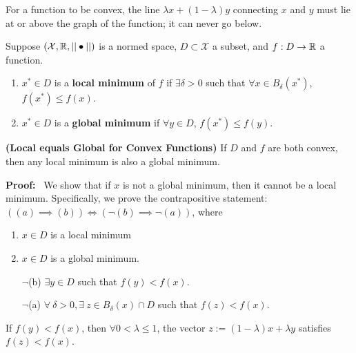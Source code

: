 \begin{rem} For a function to be convex, the line $\lambda x + (1 - \lambda)y$ connecting $x$ and $y$ must lie at or above the graph of the function; it can never go below.

\end{rem}


\begin{definition} Suppose $(\mathcal{X},\mathbb R,||  \bullet ||)$ is a normed space, $D\subset \mathcal{X}$ a subset, and $f:D\to \mathbb R$ a function.
\renewcommand{\labelenumi}{(\alph{enumi})}
\begin{enumerate}
\item
$x^\ast \in D$ is a \textbf{ local minimum} of $f$ if $\exists \delta >0$ such that $\forall x\in B_\delta(x^\ast)$,
$f(x^\ast) \le f(x)$.
\item
$x^\ast \in D$ is a \textbf{ global minimum} if $\forall y \in D$, $f(x^\ast) \le f(y)$.
\end{enumerate}

\end{definition}

\begin{thm}\textbf{(Local equals Global for Convex Functions)} If $D$ and $f$ are both convex, then any local minimum is also a global minimum.
\end{thm} 

\textbf{ Proof:}~  We show that if $x$ is not a global minimum, then it cannot be a local minimum. Specifically, we prove the contrapositive statement: $((a) \implies (b)) \iff (\lnot (b) \implies \lnot (a))$, where
\begin{enumerate}
       \renewcommand{\labelenumi}{(\alph{enumi})}
        \setlength{\itemsep}{.1cm}
    \item $x\in D$ is a local minimum
    \item $x \in D$ is a global minimum.
       
    \item[$\lnot$(b)] $\exists y \in D$ such that $f(y) < f(x)$.
    
     \item[$\lnot$(a)] $\forall~\delta>0, \exists~z\in B_\delta(x) \cap D$ such that $f(z) < f(x)$.
\end{enumerate}

\begin{claim} If $f(y) < f(x)$, then $\forall  0<\lambda\le 1$, the vector  $z:=(1-\lambda)x+\lambda y$ satisfies $f(z) < f(x)$.
\end{claim}

